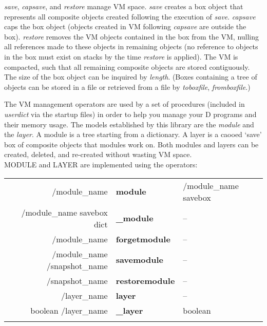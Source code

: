 \emph{save}, \emph{capsave}, and \emph{restore} manage VM space. \emph{save} creates a box object that represents all composite objects created following the execution of \emph{save}. \emph{capsave} caps the box object (objects created in VM following \emph{capsave} are outside the box). \emph{restore} removes the VM objects contained in the box from the VM, nulling all references made to these objects in remaining objects (no reference to objects in the box must exist on stacks by the time \emph{restore} is applied). The VM is compacted, such that all remaining composite objects are stored contiguously. The size of the box object can be inquired by \emph{length}. (Boxes containing a tree of objects can be stored in a file or retrieved from a file by \emph{toboxfile}, \emph{fromboxfile}.)

The VM management operators are used by a set of procedures (included in \emph{userdict} via the startup files) in order to help you manage your D programs and their memory usage. The models established by this library are the \emph{module} and the \emph{layer}. A module is a tree starting from a dictionary. A layer is a caooed `save' box of composite objects that modules work on. Both modules and layers can be created, deleted, and re-created without wasting VM space.\\

\noindent MODULE and LAYER are implemented using the operators:\\

\begin{tabular}{>{\sffamily}r>{\sffamily\bfseries}l>{\sffamily}l}
/module\_name                 & module        & /module\_name savebox\\
/module\_name savebox dict    & \_module      & --\\
/module\_name                 & forgetmodule  & --\\
/module\_name /snapshot\_name & savemodule    & --\\
/snapshot\_name               & restoremodule & --\\
/layer\_name                  & layer         & --\\
boolean /layer\_name          & \_layer       & boolean\\\\
\end{tabular}



